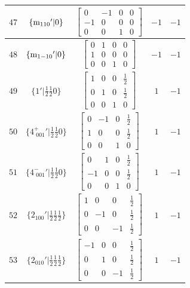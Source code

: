 \documentclass[fleqn,8pt]{jsarticle}
\begin{document}
\begin{longtable}{ccccc}
$ 47 $ & $ \{{\rm m}_{110}{}'|0\} $ & $ \begin{bmatrix} 0 & -1 & 0 & 0 \\ -1 & 0 & 0 & 0 \\ 0 & 0 & 1 & 0 \end{bmatrix} $ & $ -1 $ & $ -1 $ \\ \hline
$ 48 $ & $ \{{\rm m}_{1-10}{}'|0\} $ & $ \begin{bmatrix} 0 & 1 & 0 & 0 \\ 1 & 0 & 0 & 0 \\ 0 & 0 & 1 & 0 \end{bmatrix} $ & $ -1 $ & $ -1 $ \\ \hline
$ 49 $ & $ \{1{}'|\frac{1}{2} \frac{1}{2} 0\} $ & $ \begin{bmatrix} 1 & 0 & 0 & \frac{1}{2} \\ 0 & 1 & 0 & \frac{1}{2} \\ 0 & 0 & 1 & 0 \end{bmatrix} $ & $ 1 $ & $ -1 $ \\ \hline
$ 50 $ & $ \{4^{+}_{\,\,001}{}'|\frac{1}{2} \frac{1}{2} 0\} $ & $ \begin{bmatrix} 0 & -1 & 0 & \frac{1}{2} \\ 1 & 0 & 0 & \frac{1}{2} \\ 0 & 0 & 1 & 0 \end{bmatrix} $ & $ 1 $ & $ -1 $ \\ \hline
$ 51 $ & $ \{4^{-}_{\,\,001}{}'|\frac{1}{2} \frac{1}{2} 0\} $ & $ \begin{bmatrix} 0 & 1 & 0 & \frac{1}{2} \\ -1 & 0 & 0 & \frac{1}{2} \\ 0 & 0 & 1 & 0 \end{bmatrix} $ & $ 1 $ & $ -1 $ \\ \hline
$ 52 $ & $ \{2{}_{100}{}'|\frac{1}{2} \frac{1}{2} \frac{1}{2}\} $ & $ \begin{bmatrix} 1 & 0 & 0 & \frac{1}{2} \\ 0 & -1 & 0 & \frac{1}{2} \\ 0 & 0 & -1 & \frac{1}{2} \end{bmatrix} $ & $ 1 $ & $ -1 $ \\ \hline
$ 53 $ & $ \{2{}_{010}{}'|\frac{1}{2} \frac{1}{2} \frac{1}{2}\} $ & $ \begin{bmatrix} -1 & 0 & 0 & \frac{1}{2} \\ 0 & 1 & 0 & \frac{1}{2} \\ 0 & 0 & -1 & \frac{1}{2} \end{bmatrix} $ & $ 1 $ & $ -1 $ \\ \hline

\end{longtable}
\end{document}

